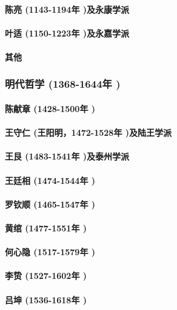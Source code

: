 \documentclass[UTF8]{../RepresentationUniverse}
\begin{document}
        \paragraph{陈亮 (1143-1194年 )及永康学派}
        \paragraph{叶适 (1150-1223年 )及永嘉学派}
        \paragraph{其他}

    \subsubsection{明代哲学 (1368-1644年 )}
        \paragraph{陈献章 (1428-1500年 )}
        \paragraph{王守仁 (王阳明，1472-1528年 )及陆王学派}
        \paragraph{王艮 (1483-1541年 )及泰州学派}
        \paragraph{王廷相 (1474-1544年 )}
        \paragraph{罗钦顺 (1465-1547年 )}
        \paragraph{黄绾 (1477-1551年 )}
        \paragraph{何心隐 (1517-1579年 )}
        \paragraph{李贽 (1527-1602年 )}
        \paragraph{吕坤 (1536-1618年 )}
\end{document}
